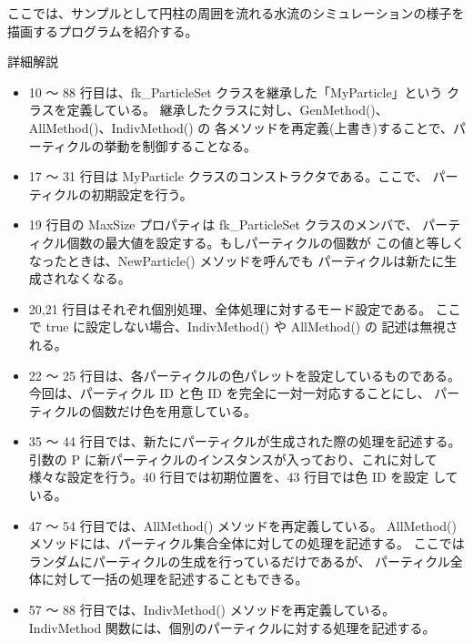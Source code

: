 ここでは、サンプルとして円柱の周囲を流れる水流のシミュレーションの様子を
描画するプログラムを紹介する。
\begin{center}
詳細解説
\end{center}
\begin{itemize}
 \item 10 〜 88 行目は、fk\_ParticleSet クラスを継承した「MyParticle」という
	クラスを定義している。
	継承したクラスに対し、GenMethod()、AllMethod()、IndivMethod() の
	各メソッドを再定義(上書き)することで、パーティクルの挙動を制御することなる。

 \item 17 〜 31 行目は MyParticle クラスのコンストラクタである。ここで、
	パーティクルの初期設定を行う。

 \item 19 行目の MaxSize プロパティは fk\_ParticleSet クラスのメンバで、
	パーティクル個数の最大値を設定する。もしパーティクルの個数が
	この値と等しくなったときは、NewParticle() メソッドを呼んでも
	パーティクルは新たに生成されなくなる。

 \item 20,21 行目はそれぞれ個別処理、全体処理に対するモード設定である。
	ここで true に設定しない場合、IndivMethod() や AllMethod() の
	記述は無視される。

 \item 22 〜 25 行目は、各パーティクルの色パレットを設定しているものである。
	今回は、パーティクル ID と色 ID を完全に一対一対応することにし、
	パーティクルの個数だけ色を用意している。

 \item 35 〜 44 行目では、新たにパーティクルが生成された際の処理を記述する。
	引数の P に新パーティクルのインスタンスが入っており、これに対して
	様々な設定を行う。40 行目では初期位置を、43 行目では色 ID を設定
	している。

 \item 47 〜 54 行目では、AllMethod() メソッドを再定義している。
	AllMethod() メソッドには、パーティクル集合全体に対しての処理を記述する。
	ここではランダムにパーティクルの生成を行っているだけであるが、
	パーティクル全体に対して一括の処理を記述することもできる。

 \item 57 〜 88 行目では、IndivMethod() メソッドを再定義している。
	IndivMethod 関数には、個別のパーティクルに対する処理を記述する。


\end{itemize}
